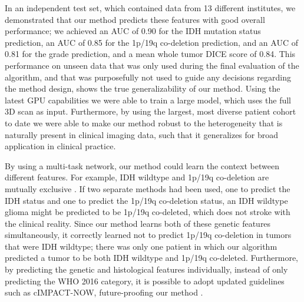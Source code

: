 In an independent test set, which contained data from 13 different institutes, we demonstrated that our method predicts these features with good overall performance; we achieved an AUC of 0.90 for the \gls{IDH} mutation status prediction, an \gls{AUC} of 0.85 for the 1p/19q co-deletion prediction, and an \gls{AUC} of 0.81 for the grade prediction, and a mean whole tumor DICE score of 0.84.
This performance on unseen data that was only used during the final evaluation of the algorithm, and that was purposefully not used to guide any decisions regarding the method design, shows the true generalizability of our method.
Using the latest GPU capabilities we were able to train a large model, which uses the full 3D scan as input.
Furthermore, by using the largest, most diverse patient cohort to date we were able to make our method robust to the heterogeneity that is naturally present in clinical imaging data, such that it generalizes for broad application in clinical practice.

By using a multi-task network, our method could learn the context between different features.
For example, \gls{IDH} wildtype and 1p/19q co-deletion are mutually exclusive \autocite{labussi2018idh}.
If two separate methods had been used, one to predict the IDH status and one to predict the 1p/19q co-deletion status, an IDH wildtype glioma might be predicted to be 1p/19q co-deleted, which does not stroke with the clinical reality.
Since our method learns both of these genetic features simultaneously, it correctly learned not to predict 1p/19q co-deletion in tumors that were IDH wildtype; there was only one patient in which our algorithm predicted a tumor to be both IDH wildtype and 1p/19q co-deleted.
Furthermore, by predicting the genetic and histological features individually, instead of only predicting the \gls{WHO} 2016 category, it is possible to adopt updated guidelines such as cIMPACT-NOW, future-proofing our method \autocite{lous2020impactnow}.

